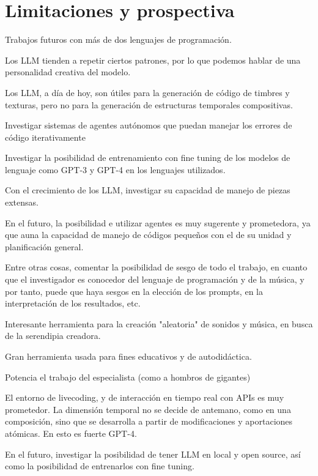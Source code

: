 \chapter{Limitaciones y prospectiva}


Trabajos futuros con más de dos lenguajes de programación.

Los LLM tienden a repetir ciertos patrones, por lo que podemos hablar de una personalidad creativa del modelo.

Los LLM, a día de hoy, son útiles para la generación de código de timbres y texturas, pero no para la generación de estructuras temporales compositivas.

Investigar sistemas de agentes autónomos que puedan manejar los errores de código iterativamente

Investigar la posibilidad de entrenamiento con fine tuning de los modelos de lenguaje como GPT-3 y GPT-4 en los lenguajes utilizados.

Con el crecimiento de los LLM, investigar su capacidad de manejo de piezas extensas.

En el futuro, la posibilidad e utilizar agentes es muy sugerente y prometedora, ya que auna la capacidad de manejo de códigos pequeños con el de su unidad y planificación general.

Entre otras cosas, comentar la posibilidad de sesgo de todo el trabajo, en cuanto que el investigador es conocedor del lenguaje de programación y de la música, y por tanto, puede que haya sesgos en la elección de los prompts, en la interpretación de los resultados, etc.

Interesante herramienta para la creación "aleatoria" de sonidos y música, en busca de la serendipia creadora.

Gran herramienta usada para fines educativos y de autodidáctica.

Potencia el trabajo del especialista (como a hombros de gigantes)

El entorno de livecoding, y de interacción en tiempo real con APIs es muy prometedor. La dimensión temporal no se decide de antemano, como en una composición, sino que se desarrolla a partir de modificaciones y aportaciones atómicas. En esto es fuerte GPT-4.

En el futuro, investigar la posibilidad de tener LLM en local y open source, así como la posibilidad de entrenarlos con fine tuning.
